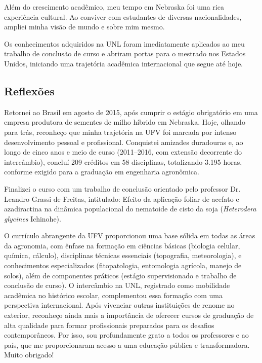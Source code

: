 \documentclass[12pt,a4paper,oneside]{book}
\begin{document}
Além do crescimento acadêmico, meu tempo em Nebraska foi uma rica experiência cultural. Ao conviver 
com estudantes de diversas nacionalidades, ampliei minha visão de mundo e sobre mim mesmo.

Os conhecimentos adquiridos na UNL foram imediatamente aplicados ao meu trabalho de conclusão de
curso e abriram portas para o mestrado nos Estados Unidos, iniciando uma trajetória acadêmica 
internacional que segue até hoje.

\subsection{Reflexões}

Retornei ao Brasil em agosto de 2015, após cumprir o estágio obrigatório em uma empresa produtora de sementes de milho híbrido 
em Nebraska. Hoje, olhando para trás, reconheço que minha trajetória na UFV foi marcada por intenso
desenvolvimento pessoal e profissional. Conquistei amizades duradouras e, ao longo de cinco anos e meio 
de curso (2011–2016, com extensão decorrente do intercâmbio), concluí 209 créditos em 58 disciplinas, 
totalizando 3.195 horas, conforme exigido para a graduação em engenharia agronômica.

Finalizei o curso com um trabalho de conclusão orientado pelo professor Dr. Leandro Grassi de Freitas, intitulado: 
  Efeito da aplicação foliar de acefato e azadiractina na dinâmica populacional do nematoide de cisto da 
soja (\textit{Heterodera glycines} Ichinohe).

O currículo abrangente da UFV proporcionou uma base sólida em todas as áreas da agronomia, com ênfase na 
formação em ciências básicas (biologia celular, química, cálculo), disciplinas técnicas essenciais
(topografia, meteorologia), e conhecimentos especializados (fitopatologia, entomologia agrícola, manejo 
                                                            de solos), além de componentes práticos (estágio supervisionado e trabalho de conclusão de curso). O 
intercâmbio na UNL, registrado como mobilidade acadêmica no histórico escolar, complementou essa 
formação com uma perspectiva internacional. Após vivenciar outras instituições de renome no exterior, 
reconheço ainda mais a importância de oferecer cursos de graduação de alta qualidade para formar 
profissionais preparados para os desafios contemporâneos. Por isso, sou profundamente grato a 
todos os professores e ao país, que me proporcionaram acesso a uma educação pública e transformadora. Muito obrigado!
  
\end{document}
